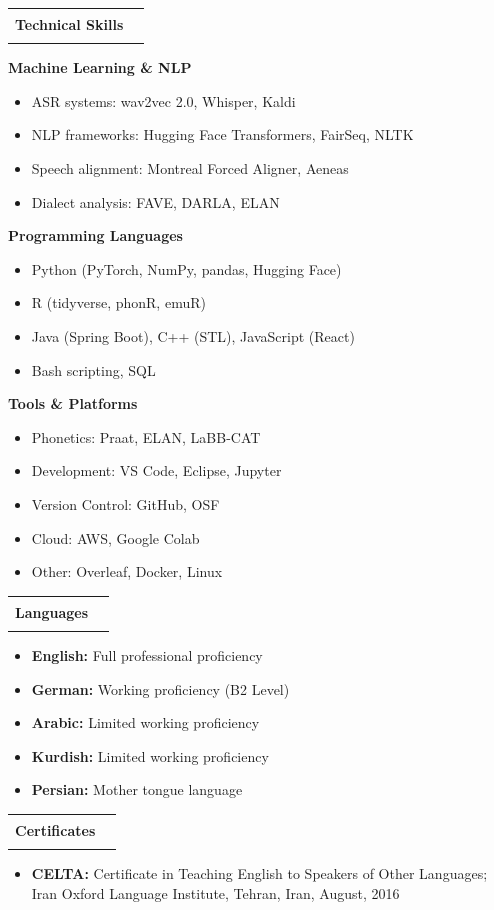 \documentclass[11pt,a4paper]{article}
\makeatletter
\newcommand{\inlinesection}[1]{%
  \vspace{1em}
  \noindent
  \begin{tabular*}{\linewidth}{@{}l@{\extracolsep{\fill}}r@{}}
    \Large\textbf{\color{darkblue} #1} & \color{darkblue}\rule{0.7\linewidth}{1.2pt} \\
  \end{tabular*}
  \par\vspace{0.7em}
}
\makeatother
\begin{document}
\inlinesection{Technical Skills}
\begin{list}{}{
  \setlength{\leftmargin}{0pt}
  \setlength{\labelwidth}{0pt}
  \setlength{\itemindent}{0pt}
  \setlength{\parsep}{0pt}
  \setlength{\itemsep}{1em}
}
\item \textcolor{RedViolet}{\textbf{Machine Learning \& NLP}} \vspace{0.5em}
      \begin{itemize}
          \item ASR systems: wav2vec 2.0, Whisper, Kaldi
          \item NLP frameworks: Hugging Face Transformers, FairSeq, NLTK
          \item Speech alignment: Montreal Forced Aligner, Aeneas
          \item Dialect analysis: FAVE, DARLA, ELAN
      \end{itemize}
      
\item \textcolor{RedViolet}{\textbf{Programming Languages}} \vspace{0.5em}
      \begin{itemize}
          \item Python (PyTorch, NumPy, pandas, Hugging Face)
          \item R (tidyverse, phonR, emuR)
          \item Java (Spring Boot), C++ (STL), JavaScript (React)
          \item Bash scripting, SQL
      \end{itemize}

\item \textcolor{RedViolet}{\textbf{Tools \& Platforms}} \vspace{0.5em}
      \begin{itemize}
          \item Phonetics: Praat, ELAN, LaBB-CAT
          \item Development: VS Code, Eclipse, Jupyter
          \item Version Control: GitHub, OSF
          \item Cloud: AWS, Google Colab
          \item Other: Overleaf, Docker, Linux
      \end{itemize}
\end{list}

\inlinesection{Languages}
\begin{itemize}
    \item \textbf{English:} Full professional proficiency
    \item \textbf{German:} Working proficiency (B2 Level)
    \item \textbf{Arabic:} Limited working proficiency
    \item \textbf{Kurdish:} Limited working proficiency
    \item \textbf{Persian:} Mother tongue language
\end{itemize}

\inlinesection{Certificates}
\begin{itemize}
    \item \textbf{CELTA:} Certificate in Teaching English to Speakers of Other Languages; Iran Oxford Language Institute, Tehran, Iran, August, 2016
\end{itemize}
\end{document}
